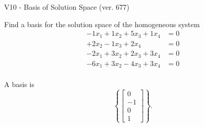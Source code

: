 \begin{exercise}
  \begin{exerciseTitle}V10 - Basis of Solution Space (ver. 677)\end{exerciseTitle}
  \begin{exerciseStatement}
    Find a basis for the solution space of the homogeneous system 
\begin{align*}
 -1 x_ 1 + 1 x_ 2 + 5 x_ 3 + 1 x_ 4 &= 0  \\ 
  + 2 x_ 2 -1 x_ 3 + 2 x_ 4 &= 0  \\ 
  -2 x_ 1 + 3 x_ 2 + 2 x_ 3 + 3 x_ 4 &= 0  \\ 
  -6 x_ 1 + 3 x_ 2 -4 x_ 3 + 3 x_ 4 &= 0  \\ 
 \end{align*}


 
  \end{exerciseStatement}

  \begin{exerciseAnswer}
   A basis is   
\[\left\{\left[\begin{array}{c}
0 \\
-1 \\
0 \\
1
\end{array}\right]\right\}.\]

  


  \end{exerciseAnswer}
\end{exercise}